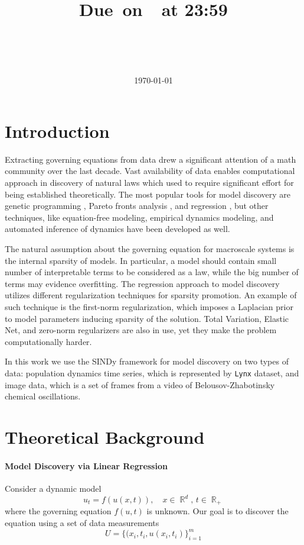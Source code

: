 \documentclass{article}
\title{
    \vspace{2in}
    \textmd{\textbf{\hmwkClass\\\ \hmwkTitle}}\\
    \normalsize\vspace{0.1in}\small{Due\ on\ \hmwkDueDate\ at 23:59}\\
    \vspace{0.1in}\large{\textit{\hmwkClassInstructor}}
    \vspace{1in}\\
    \justify{\textbf{Abstract: }\hmwkAbstract}
    \vspace{1in}
}
\author{\hmwkAuthorName\\ \hmwkAuthorEmail}
\date{\today}
\DeclareMathOperator{\R}{\mathbb{R}}
\begin{document}
\maketitle
\newpage
\section{Introduction}
Extracting governing equations from data drew a significant attention of a math community over the last decade. Vast availability of data enables computational approach in discovery of natural laws which used to require significant effort for being established theoretically. The most popular tools for model discovery are genetic programming \cite{genetic}, Pareto fronts analysis \cite{pareto}, and regression \cite{kutz}, but other techniques, like equation-free modeling, empirical dynamics modeling, and automated inference of dynamics have been developed as well. 

The natural assumption about the governing equation for macroscale systems is the internal sparsity of models. In particular, a model should contain small number of interpretable terms to be considered as a law, while the big number of terms may evidence overfitting. The regression approach to model discovery utilizes different regularization techniques for sparsity promotion. An example of such technique is the first-norm regularization, which imposes a Laplacian prior to model parameters inducing sparsity of the solution. Total Variation, Elastic Net, and zero-norm regularizers are also in use, yet they make the problem computationally harder. 

In this work we use the SINDy framework \cite{kutz} for model discovery on two types of data: population dynamics time series, which is represented by \texttt{Lynx} dataset, and image data, which is a set of frames from a video of Belousov-Zhabotinsky chemical oscillations. 

\section{Theoretical Background}
\paragraph{Model Discovery via Linear Regression}
Consider a dynamic model 
    \[
        u_t = f(u(x,t)), \quad x \in \R^d, \, t \in \R_+
    \]
    where the governing equation $f(u, t)$ is unknown. Our goal is to discover the equation using a set of data measurements 
    \[
        U = \{(x_i, t_i, u(x_i, t_i)\}_{i=1}^{m}
    \]
    
\end{document}

